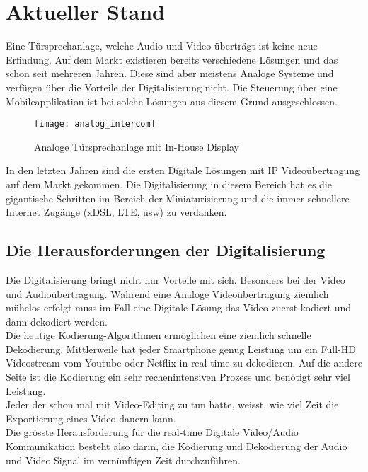\section{Aktueller Stand}
\label{sec:chapterexample}

Eine Türsprechanlage, welche Audio und Video überträgt ist keine neue Erfindung. Auf dem Markt existieren bereits verschiedene Lösungen und das schon seit mehreren Jahren. Diese sind aber meistens Analoge Systeme und verfügen über die Vorteile der Digitalisierung nicht. Die Steuerung über eine Mobileapplikation ist bei solche Lösungen aus diesem Grund ausgeschlossen.

\begin{figure}[htb!]
	\begin{center}
		\texttt{[image: analog\_intercom]}
		\caption[Analoge Türsprechanlage mit In-House Display]{Analoge Türsprechanlage mit In-House Display}
		\label{fig:analoge_intercom}
	\end{center}
\end{figure}

In den letzten Jahren sind die ersten Digitale Lösungen mit IP Videoübertragung auf dem Markt gekommen. Die Digitalisierung in diesem Bereich hat es die gigantische Schritten im Bereich der Miniaturisierung und die immer schnellere Internet Zugänge (xDSL, LTE, usw) zu verdanken.

\subsection{Die Herausforderungen der Digitalisierung}
Die Digitalisierung bringt nicht nur Vorteile mit sich. Besonders bei der Video und Audioübertragung. Während eine Analoge Videoübertragung ziemlich mühelos erfolgt muss im Fall eine Digitale Lösung das Video zuerst kodiert und dann dekodiert werden.
\\
Die heutige Kodierung-Algorithmen ermöglichen eine ziemlich schnelle Dekodierung. Mittlerweile hat jeder Smartphone genug Leistung um ein Full-HD Videostream vom Youtube oder Netflix in real-time zu dekodieren. Auf die andere Seite ist die Kodierung ein sehr rechenintensiven Prozess und benötigt sehr viel Leistung.
\\
Jeder der schon mal mit Video-Editing zu tun hatte, weisst, wie viel Zeit die Exportierung eines Video dauern kann.
\\
Die grösste Herausforderung für die real-time Digitale Video/Audio Kommunikation besteht also darin, die Kodierung und Dekodierung der Audio und Video Signal im vernünftigen Zeit durchzuführen. 

